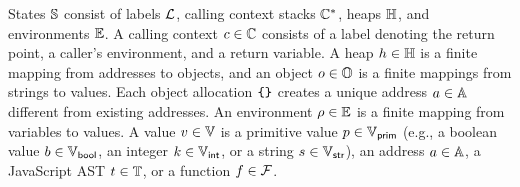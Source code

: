 States $\mathbb{S}$ consist of labels $\mathcal{L}$, calling context stacks
$\mathbb{C}^*$, heaps $\mathbb{H}$, and environments $\mathbb{E}$.  A calling context
$c \in \mathbb{C}$ consists of a label denoting the return point, a caller's
environment, and a return variable.  A heap $h \in \mathbb{H}$ is a finite
mapping from addresses to objects, and an object $o \in \mathbb{O}$ is a finite
mappings from strings to values.  Each object allocation $\texttt{\{} \texttt{\}}$ creates a
unique address $a \in \mathbb{A}$ different from existing addresses.  An
environment $\rho \in \mathbb{E}$ is a finite mapping from variables to values. A
value $v \in \mathbb{V}$ is a primitive value $p \in \mathbb{V}_{\textsf{prim}}$ (e.g., a
boolean value $b \in \mathbb{V}_{\textsf{bool}}$, an integer $k \in \mathbb{V}_{\textsf{int}}$, or a string
$s \in \mathbb{V}_{\textsf{str}}$), an address $a \in \mathbb{A}$, a JavaScript AST $t
\in \mathbb{T}$, or a function $f \in \mathcal{F}$.


